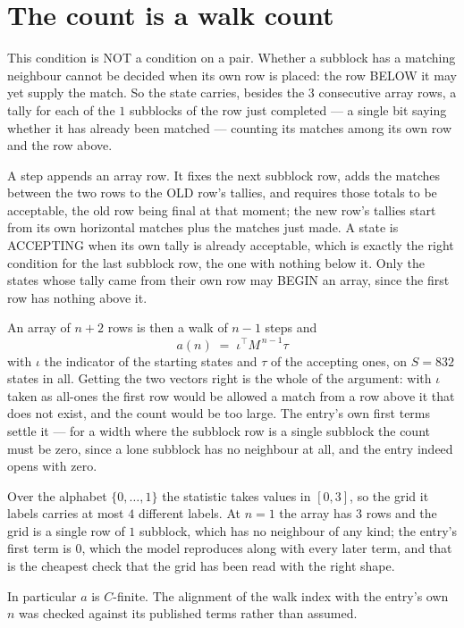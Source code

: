 \documentclass[11pt,a4paper]{article}
\theoremstyle{plain}
\theoremstyle{definition}
\begin{document}
\section{The count is a walk count}

This condition is NOT a condition on a pair. Whether a subblock has a
matching neighbour cannot be decided when its own row is placed: the row BELOW it may yet
supply the match. So the state carries, besides the $3$ consecutive array rows, a tally for
each of the $1$ subblocks of the row just completed --- a single bit saying whether it has already been matched --- counting its matches
among its own row and the row above.

A step appends an array row. It fixes the next subblock row, adds the matches between the two
rows to the OLD row's tallies, and requires those totals to be acceptable, the old row being
final at that moment; the new row's tallies start from its own horizontal matches plus the
matches just made. A state is ACCEPTING when its own tally is already acceptable, which is
exactly the right condition for the last subblock row, the one with nothing below it. Only the
states whose tally came from their own row may BEGIN an array, since the first row has nothing
above it.

An array of $n+2$ rows is then a walk of $n-1$ steps and
\[
a(n)\;=\;\iota^{\!\top}M^{\,n-1}\tau
\]
with $\iota$ the indicator of the starting states and $\tau$ of the accepting ones, on
$S=832$ states in all. Getting the two vectors right is the whole of the argument: with
$\iota$ taken as all-ones the first row would be allowed a match from a row above it that does
not exist, and the count would be too large. The entry's own first terms settle it --- for
a width where the subblock row is a single subblock
the count must be zero, since a lone subblock has no neighbour at all, and the entry indeed opens with zero.

Over the alphabet $\{0,\dots,1\}$ the statistic takes values in $[0,3]$, so the
grid it labels carries at most $4$ different labels. At $n=1$ the array has $3$
rows and the grid is a single row of $1$
subblock, which has no neighbour of any kind; the entry's first term is
$0$, which the model reproduces along with every later term, and that is the cheapest
check that the grid has been read with the right shape.

In particular $a$ is $C$-finite. The alignment of the walk index with the entry's own $n$ was
checked against its published terms rather than assumed.
\end{document}
